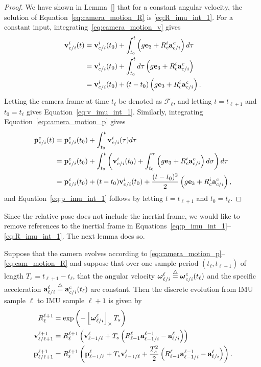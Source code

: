 \begin{proof}
	We have shown in Lemma~\ref{} that for a constant angular velocity, the solution of Equation~\eqref{eq:camera_motion_R} is \eqref{eq:R_imu_int_1}.
	For a constant input, integrating~\eqref{eq:camera_motion_v} gives
	\begin{align*}
	\mathbf{v}_{c/i}^i(t) &= \mathbf{v}_{c/i}^i(t_0) + \int_{t_0}^t \left(g\mathbf{e}_3 + R_c^i \mathbf{a}_{c/i}^c\right)d\tau \\
		&= \mathbf{v}_{c/i}^i(t_0) + \int_{t_0}^t d\tau \left(g\mathbf{e}_3 + R_c^i \mathbf{a}_{c/i}^c\right) \\
		&= \mathbf{v}_{c/i}^i(t_0) + (t-t_0) \left(g\mathbf{e}_3 + R_c^i \mathbf{a}_{c/i}^c\right).
	\end{align*}
	Letting the camera frame at time $t_\ell$ be denoted as $\mathcal{F}_\ell$, and letting $t=t_{\ell+1}$ and $t_0=t_{\ell}$ gives Equation~\eqref{eq:v_imu_int_1}.  Similarly, integrating Equation~\eqref{eq:camera_motion_p} gives
	\begin{align*}
	\mathbf{p}_{c/i}^c(t) &= \mathbf{p}_{c/i}^c(t_0) + \int_{t_0}^t \mathbf{v}_{c/i}^i(\tau)d\tau \\
		&= \mathbf{p}_{c/i}^c(t_0) + \int_{t_0}^t \left(\mathbf{v}_{c/i}^i(t_0) + \int_{t_0}^\tau \left(g\mathbf{e}_3 + R_c^i \mathbf{a}_{c/i}^c\right)d\sigma \right) d\tau \\
		&= \mathbf{p}_{c/i}^c(t_0) + (t-t_0)\mathbf{v}_{c/i}^i(t_0) + \frac{(t-t_0)^2}{2}\left(g\mathbf{e}_3 + R_c^i \mathbf{a}_{c/i}^c\right),
	\end{align*}
	and Equation~\eqref{eq:p_imu_int_1} follows by letting $t=t_{\ell+1}$ and $t_0=t_{\ell}$.
\end{proof}
Since the relative pose does not include the inertial frame, we would like to remove references to the inertial frame in Equations~\eqref{eq:p_imu_int_1}--\eqref{eq:R_imu_int_1}.  The next lemma does so.
\begin{lemma}
	Suppose that the camera evolves according to \eqref{eq:camera_motion_p}--\eqref{eq:cam_motion_R} and suppose that over one sample period $(t_\ell, t_{\ell+1})$ of length $T_s=t_{\ell+1}-t_\ell$, that the angular velocity $\boldsymbol{\omega}_{\ell/i}^{\ell}\stackrel{\triangle}{=}\boldsymbol{\omega}_{c/i}^c(t_\ell)$ and the specific acceleration $\mathbf{a}_{\ell/i}^{\ell}\stackrel{\triangle}{=} \mathbf{a}_{c/i}^c(t_\ell)$ are constant.  Then the discrete evolution from IMU sample $\ell$ to IMU sample $\ell+1$ is given by
	\begin{align}
	R_{\ell}^{\ell+1} &= \exp\left(-\ss{\omegabf_{\ell/i}^{\ell}} T_s \right)
		\label{eq:R_imu_int_2} \\
	\vbf_{\ell/\ell+1}^{\ell+1} &= R_{\ell}^{\ell+1}\left( \vbf_{\ell-1/\ell}^{\ell} 
		+ T_s \left(R_{\ell-1}^\ell \abf_{\ell-1/i}^{\ell-1} - \abf_{\ell/i}^\ell \right) \right)  \label{eq:v_imu_int_2} \\
	\pbf_{\ell/\ell+1}^{\ell+1} &= R_{\ell}^{\ell+1}\left(\pbf_{\ell-1/\ell}^{\ell} 
		+T_s\vbf_{\ell-1/\ell}^{\ell} + \frac{T_s^2}{2}\left(R_{\ell-1}^\ell \abf_{\ell-1/i}^{\ell-1} - \abf_{\ell/i}^{\ell}\right)\right).
		\label{eq:p_imu_int_2}
\end{align}
\end{lemma}
